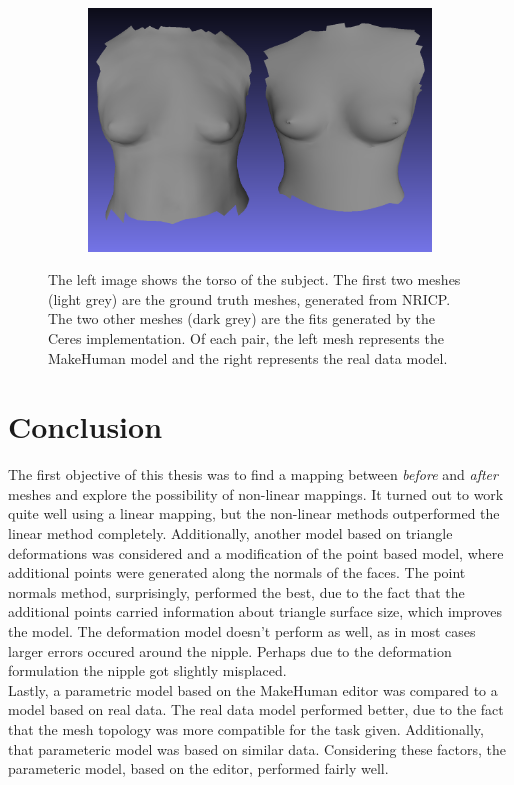 \begin{figure}
\begin{subfigure}{.38\textwidth}
  \centering
  \includegraphics[width=1\linewidth]{figures/before57_cropped}
\end{subfigure}
\caption[Comparison image, fitted and ICP]{The left image shows the torso of the subject. The first two meshes (light grey) are the ground truth meshes, generated from NRICP. The two other meshes (dark grey) are the fits generated by the Ceres implementation. Of each pair, the left mesh represents the MakeHuman model and the right represents the real data model.}
\label{fig:compimagefiticp}
\end{figure}

\chapter{Conclusion}
The first objective of this thesis was to find a mapping between \textit{before} and \textit{after} meshes and explore the possibility of non-linear mappings. It turned out to work quite well using a linear mapping, but the non-linear methods outperformed the linear method completely. Additionally, another model based on triangle deformations was considered and a modification of the point based model, where additional points were generated along the normals of the faces. The point normals method, surprisingly, performed the best, due to the fact that the additional points carried information about triangle surface size, which improves the model. The deformation model doesn't perform as well, as in most cases larger errors occured around the nipple. Perhaps due to the deformation formulation the nipple got slightly misplaced. \\
Lastly, a parametric model based on the MakeHuman editor was compared to a model based on real data. The real data model performed better, due to the fact that the mesh topology was more compatible for the task given. Additionally, that parameteric model was based on similar data. Considering these factors, the parameteric model, based on the editor, performed fairly well.

